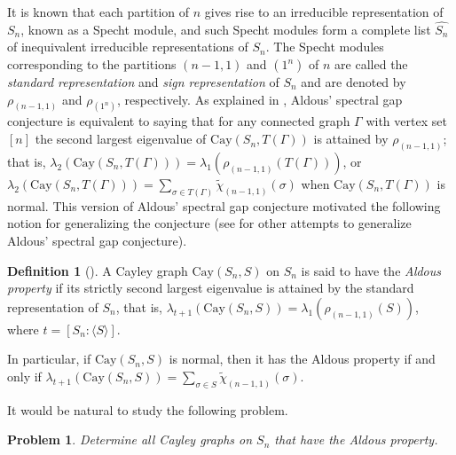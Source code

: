 \documentclass[12pt, a4paper]{article}
\newtheorem{prob}[thm]{Problem}
\theoremstyle{definition}
\newtheorem{def1}{Definition}[section]
\begin{document}
It is known \cite{Sagan} that each partition of $n$ gives rise to an irreducible representation of $S_n$, known as a Specht module, and such Specht modules form a complete list $\widehat{S_n}$ of inequivalent irreducible representations of $S_n$. The Specht modules corresponding to the partitions $(n-1,1)$ and $(1^n)$ of $n$ are called the \emph{standard representation} and \emph{sign representation} of $S_n$ and are denoted by $\rho_{(n-1,1)}$ and $\rho_{(1^n)}$, respectively. As explained in \cite{C,C2,PP}, Aldous' spectral gap conjecture is equivalent to saying that for any connected graph $\Gamma$ with vertex set $[n]$ the second largest eigenvalue of $\mathrm{Cay}(S_n, T(\Gamma))$ is attained by $\rho_{(n-1,1)}$; that is, $\lambda_{2}(\mathrm{Cay}(S_n, T(\Gamma))) = \lambda_1(\rho_{(n-1,1)}(T(\Gamma)))$, or $\lambda_{2}(\mathrm{Cay}(S_n, T(\Gamma))) = \sum_{\sigma \in T(\Gamma)} \tilde{\chi}_{(n-1,1)}(\sigma)$ when $\mathrm{Cay}(S_n, T(\Gamma))$ is normal. This version of Aldous' spectral gap conjecture motivated the following notion for generalizing the conjecture (see \cite{AKP,C3,K,PP} for other attempts to generalize Aldous' spectral gap conjecture). 

\begin{def1}
[{\cite[Definition 1.1]{LXZ}}] 
A Cayley graph $\mathrm{Cay}(S_n, S)$ on $S_n$ is said to have the \emph{Aldous property} if its strictly second largest eigenvalue is attained by the standard representation of $S_n$, that is, $\lambda_{t+1}(\mathrm{Cay}(S_n, S)) = \lambda_1(\rho_{(n-1,1)}(S))$, where $t = [S_n:\langle S \rangle]$.  
\end{def1}

In particular, if $\mathrm{Cay}(S_n, S)$ is normal, then it has the Aldous property if and only if $\lambda_{t+1}(\mathrm{Cay}(S_n, S)) = \sum_{\sigma \in S} \tilde{\chi}_{(n-1,1)}(\sigma)$. 

It would be natural to study the following problem. 

\begin{prob}
\label{prob}
Determine all Cayley graphs on $S_n$ that have the Aldous property.
\end{prob}
\end{document}
